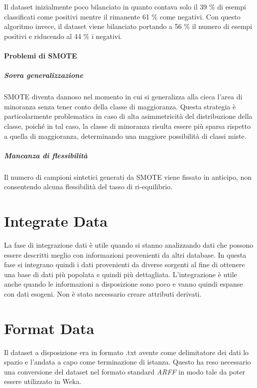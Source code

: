 Il dataset inizialmente poco bilanciato in quanto contava solo il 39 \% di esempi classificati come positivi mentre il rimanente 61 \% come negativi. Con questo algoritmo invece, il dataset viene bilanciato portando a 56 \% il numero di esempi positivi e riducendo al 44 \% i negativi.
\paragraph*{Problemi di SMOTE}
\subparagraph*{Sovra generalizzazione}

SMOTE diventa dannoso nel momento in cui si generalizza alla cieca l'area di minoranza senza tener conto della classe di maggioranza. Questa strategia è particolarmente problematica in caso di alta asimmetricità del distribuzione della classe, poiché in tal caso, la classe di minoranza risulta essere più sparsa rispetto a quella di maggioranza, determinando una maggiore possibilità di classi miste.

\subparagraph*{Mancanza di flessibilità}
Il numero di campioni sintetici generati da SMOTE viene fissato in anticipo, non consentendo alcuna flessibilità del tasso di ri-equilibrio.


\section{Integrate Data}
La fase di integrazione dati è utile quando si stanno analizzando dati che possono essere descritti meglio con informazioni provenienti da altri database. In questa fase si integrano quindi i dati provenienti da diverse sorgenti al fine di ottenere una base di dati più popolata e quindi più dettagliata. L'integrazione è utile anche quando le informazioni a disposizione sono poco e vanno quindi espanse con dati esogeni.
Non è stato necessario creare attributi derivati.

\section{Format Data}
Il dataset a disposizione era in formato .txt avente come delimitatore dei dati lo spazio e l'andata a capo come terminazione di istanza. Questo ha reso necessario una conversione del dataset nel formato standard \textit{ARFF} in modo tale da poter essere utilizzato in Weka.
